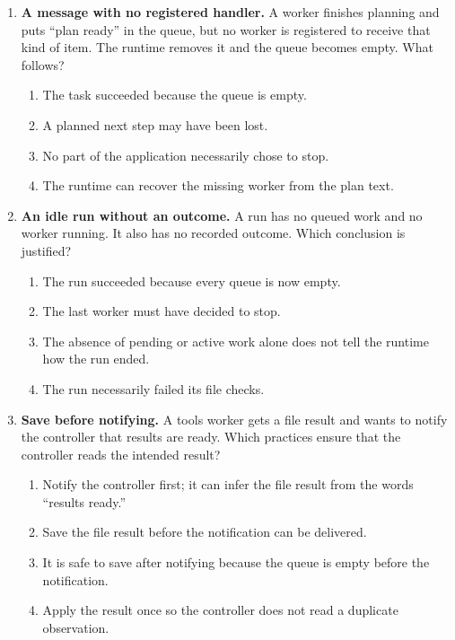 \begin{enumerate}[start=41,itemsep=0.7\baselineskip]
\item\label{exercise:43} \begin{minipage}[t]{\linewidth}
\textbf{A message with no registered handler.} A worker finishes planning and puts ``plan ready'' in the queue, but no worker is registered to receive that kind of item. The runtime removes it and the queue becomes empty. What follows?
\begin{enumerate}[label=\textnormal{(\Alph*)},leftmargin=*,itemsep=0pt]
\item The task succeeded because the queue is empty.
\item A planned next step may have been lost.
\item No part of the application necessarily chose to stop.
\item The runtime can recover the missing worker from the plan text.
\end{enumerate}
\end{minipage}

\item\label{exercise:44} \begin{minipage}[t]{\linewidth}
\textbf{An idle run without an outcome.} A run has no queued work and no worker running. It also has no recorded outcome. Which conclusion is justified?
\begin{enumerate}[label=\textnormal{(\Alph*)},leftmargin=*,itemsep=0pt]
\item The run succeeded because every queue is now empty.
\item The last worker must have decided to stop.
\item The absence of pending or active work alone does not tell the runtime how the run ended.
\item The run necessarily failed its file checks.
\end{enumerate}
\end{minipage}

\item\label{exercise:45} \begin{minipage}[t]{\linewidth}
\textbf{Save before notifying.} A tools worker gets a file result and wants to notify the controller that results are ready. Which practices ensure that the controller reads the intended result?
\begin{enumerate}[label=\textnormal{(\Alph*)},leftmargin=*,itemsep=0pt]
\item Notify the controller first; it can infer the file result from the words ``results ready.''
\item Save the file result before the notification can be delivered.
\item It is safe to save after notifying because the queue is empty before the notification.
\item Apply the result once so the controller does not read a duplicate observation.
\end{enumerate}
\end{minipage}


\end{enumerate}
